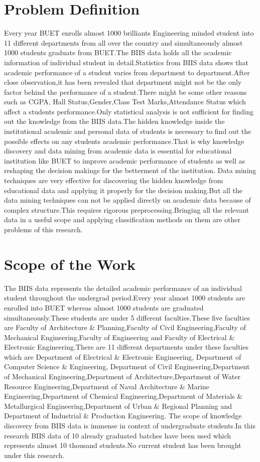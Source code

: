 \documentclass[a4paper,12pt]{book}
\begin{document}
\section{Problem Definition}
Every year BUET enrolls almost 1000 brilliants Engineering minded student into 11 different departments from all over the country and simultaneously almost 1000 students graduate from BUET.The BIIS data holds all the academic information of individual student in detail.Statistics from BIIS data shows that academic performance of a student varies from department to department.After close observation,it has been revealed that department might not be the only factor behind the performance of a student.There might be some other reasons such as CGPA, Hall Status,Gender,Class Test Marks,Attendance Status which affect a students performance.Only statistical analysis is not sufficient for finding out the knowledge from the BIIS data.The hidden knowledge inside the institutional academic and personal data of students is necessary to find out the possible effects on any students academic performance.That is why knowledge discovery and data mining from academic data is essential for educational institution like BUET to improve academic performance of students as well as reshaping the decision makings for the betterment of the institution.
Data mining techniques are very effective for discovering the hidden knowledge from educational data and applying it properly for the decision making.But all the data mining techniques can not be applied directly on academic data because of complex structure.This requires rigorous preprocessing.Bringing all the relevant data in a useful scope and applying classification methods on them are other problems of this research. 
\section{Scope of the Work}
The BIIS data represents the detailed academic performance of an individual student throughout the undergrad period.Every year almost 1000 students are enrolled into BUET whereas almost 1000 students are graduated simultaneously.These students are under 5 different faculties.These five faculties are Faculty of Architecture \& Planning,Faculty of Civil Engineering,Faculty of Mechanical Engineering,Faculty of Engineering and Faculty of Electrical \& Electronic Engineering.There are 11 different departments under these faculties which are Department of Electrical \& Electronic Engineering, Department of Computer Science \& Engineering, Department of Civil Engineering,Department of Mechanical Engineering,Department of Architecture,Department of Water Resource Engineering,Department of Naval Architecture \& Marine Engineering,Department of Chemical Engineering,Department of Materials \& Metallurgical Engineering,Department of Urban \& Regional Planning and Department of Industrial \& Production Engineering. \cite{buet}
The scope of knowledge discovery from BIIS data is immense in context of undergraduate students.In this research BIIS data of 10 already graduated batches have been used which represents almost 10 thousand students.No current student has been brought under this research. 
\end{document}

